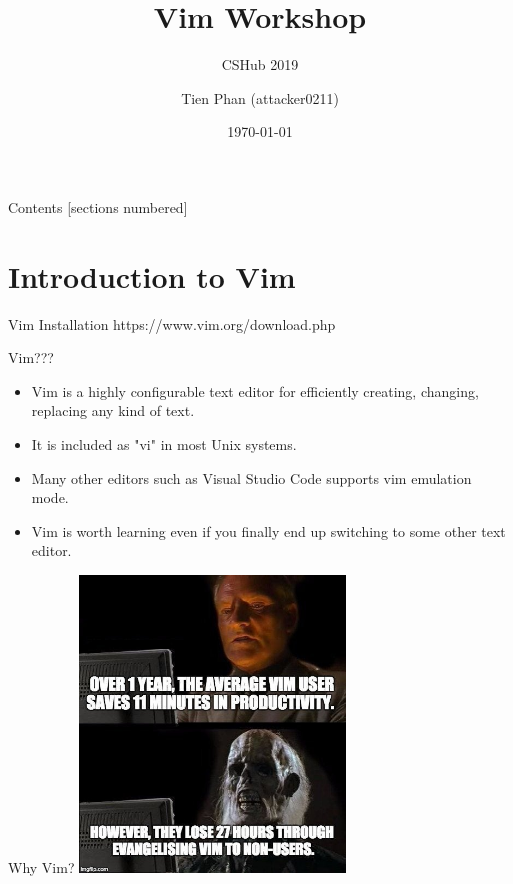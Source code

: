 \documentclass[10pt]{beamer}
\title{Vim Workshop}
\subtitle{CSHub 2019}
\date{\today}
\date{}
\author{Tien Phan (attacker0211)}
\institute{York University, Toronto, Canada}
\begin{document}
\maketitle

\begin{frame}{Contents}
  [sections numbered]
  \tableofcontents[hideallsubsections]
\end{frame}


\section{Introduction to Vim}

\begin{frame}{Vim Installation}
https://www.vim.org/download.php
\end{frame}

\begin{frame}{Vim???}
\begin{itemize}
  \item<1-> Vim is a highly configurable text editor for efficiently creating, changing, replacing any kind of text.
  \item<2-> It is included as "vi" in most Unix systems.
  \item<3-> Many other editors such as Visual Studio Code supports vim emulation mode.
  \item<3-> Vim is worth learning even if you finally end up switching to some other text editor.
\end{itemize}
\end{frame}

\begin{frame}{Why Vim?}
  \includegraphics[width=200pt]{vimi.jpg}
\end{frame}
\end{document}
